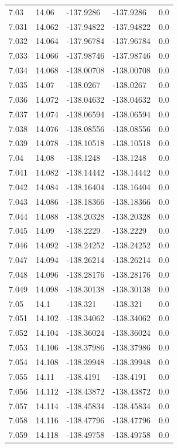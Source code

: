 \begin{tabular}{lllll}
7.03 & 14.06 & -137.9286 & -137.9286 & 0.0 \\
7.031 & 14.062 & -137.94822 & -137.94822 & 0.0 \\
7.032 & 14.064 & -137.96784 & -137.96784 & 0.0 \\
7.033 & 14.066 & -137.98746 & -137.98746 & 0.0 \\
7.034 & 14.068 & -138.00708 & -138.00708 & 0.0 \\
7.035 & 14.07 & -138.0267 & -138.0267 & 0.0 \\
7.036 & 14.072 & -138.04632 & -138.04632 & 0.0 \\
7.037 & 14.074 & -138.06594 & -138.06594 & 0.0 \\
7.038 & 14.076 & -138.08556 & -138.08556 & 0.0 \\
7.039 & 14.078 & -138.10518 & -138.10518 & 0.0 \\
7.04 & 14.08 & -138.1248 & -138.1248 & 0.0 \\
7.041 & 14.082 & -138.14442 & -138.14442 & 0.0 \\
7.042 & 14.084 & -138.16404 & -138.16404 & 0.0 \\
7.043 & 14.086 & -138.18366 & -138.18366 & 0.0 \\
7.044 & 14.088 & -138.20328 & -138.20328 & 0.0 \\
7.045 & 14.09 & -138.2229 & -138.2229 & 0.0 \\
7.046 & 14.092 & -138.24252 & -138.24252 & 0.0 \\
7.047 & 14.094 & -138.26214 & -138.26214 & 0.0 \\
7.048 & 14.096 & -138.28176 & -138.28176 & 0.0 \\
7.049 & 14.098 & -138.30138 & -138.30138 & 0.0 \\
7.05 & 14.1 & -138.321 & -138.321 & 0.0 \\
7.051 & 14.102 & -138.34062 & -138.34062 & 0.0 \\
7.052 & 14.104 & -138.36024 & -138.36024 & 0.0 \\
7.053 & 14.106 & -138.37986 & -138.37986 & 0.0 \\
7.054 & 14.108 & -138.39948 & -138.39948 & 0.0 \\
7.055 & 14.11 & -138.4191 & -138.4191 & 0.0 \\
7.056 & 14.112 & -138.43872 & -138.43872 & 0.0 \\
7.057 & 14.114 & -138.45834 & -138.45834 & 0.0 \\
7.058 & 14.116 & -138.47796 & -138.47796 & 0.0 \\
7.059 & 14.118 & -138.49758 & -138.49758 & 0.0 \\

\end{tabular}
